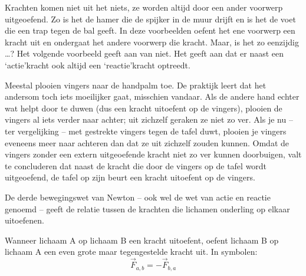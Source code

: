 \documentclass{ximera}
\begin{document}
	\author{Bart Lambregs}
    \xmsource\xmuitleg

Krachten komen niet uit het niets, ze worden altijd door een ander voorwerp uitgeoefend. Zo is het de hamer die de spijker in de muur drijft en is het de voet die een trap tegen de bal geeft. In deze voorbeelden oefent het ene voorwerp een kracht uit en ondergaat het andere voorwerp die kracht. Maar, is het zo eenzijdig \ldots? Het volgende voorbeeld geeft aan van niet. Het geeft aan dat er naast een `actie'kracht ook altijd een `reactie'kracht optreedt.

\begin{example}
	Meestal plooien vingers naar de handpalm toe. De praktijk leert dat het andersom toch iets moeilijker gaat, misschien vandaar. Als de andere hand echter wat helpt door te duwen (dus een kracht uitoefent op de vingers), plooien de vingers al iets verder naar achter; uit zichzelf geraken ze niet zo ver. Als je nu -- ter vergelijking -- met gestrekte vingers tegen de tafel duwt, plooien je vingers eveneens meer naar achteren dan dat ze uit zichzelf zouden kunnen. Omdat de vingers zonder een extern uitgeoefende kracht niet zo ver kunnen doorbuigen, valt te concluderen dat naast de kracht die door de vingers op de tafel wordt uitgeoefend, de tafel op zijn beurt een kracht uitoefent op de vingers.
\end{example}

	
De derde bewegingswet van Newton -- ook wel de wet van actie en reactie genoemd -- geeft de relatie tussen de krachten die lichamen onderling op elkaar uitoefenen.

\begin{definition}\nl

Wanneer lichaam A op lichaam B een kracht uitoefent, oefent lichaam B op lichaam A een even grote maar tegengestelde kracht uit. In symbolen:
\begin{equation*}
	\vec{F}_{a,b}=-\vec{F}_{b,a}
\end{equation*}
\end{definition}
\end{document}
